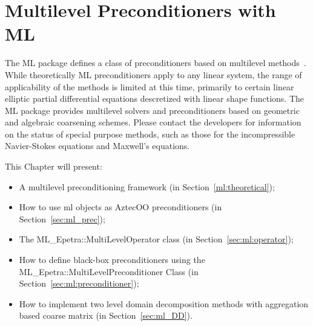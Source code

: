 % 
% 
% 
%  
%  
% 
\section{Multilevel Preconditioners with ML}
\label{chap:ml}
The ML package defines a class of preconditioners based on multilevel
methods~\cite{Briggs2000,TuminaroTong:00a}. 
While theoretically ML preconditioners apply to any linear system,
the range of applicability of the methods is limited at this time,
primarily to certain linear elliptic partial differential equations
descretized with linear shape functions.
The ML package provides multilevel solvers and preconditioners based on
geometric and algebraic coarsening schemes.
Please contact the developers for information on the status of special purpose
methods, such as those for the incompressible Navier-Stokes equations
and Maxwell's equations.

This Chapter will present:
\begin{itemize}
\item A multilevel preconditioning framework (in Section~\ref{ml:theoretical});
\item How to use ml objects as AztecOO preconditioners (in
  Section~\ref{sec:ml_prec});
\item The ML\_Epetra::MultiLevelOperator class (in
  Section~\ref{sec:ml:operator});
\item How to define black-box preconditioners using the
  ML\_Epetra::MultiLevelPreconditioner Class (in
  Section~\ref{sec:ml:preconditioner});
\item How to implement two level domain decomposition methods with
  aggregation based coarse matrix (in Section~\ref{sec:ml_DD}).
\end{itemize}
